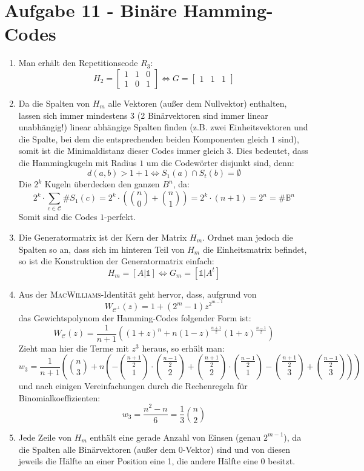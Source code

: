 \section*{Aufgabe 11 - Binäre Hamming-Codes}
\begin{enumerate}
\item
	Man erhält den Repetitionscode $R_{3}$:
	\[ H_{2} = \begin{bmatrix}1&1&0\\1&0&1\end{bmatrix} \Leftrightarrow G =
	\begin{bmatrix}1&1&1\end{bmatrix} \]
\item
	Da die Spalten von $H_{m}$ alle Vektoren (außer dem Nullvektor)
	enthalten, lassen sich immer mindestens 3 (2 Binärvektoren sind immer
	linear unabhängig!) linear abhängige Spalten finden (z.B. zwei
	Einheitsvektoren und die Spalte, bei dem die entsprechenden beiden
	Komponenten gleich $1$ sind), somit ist die Minimaldistanz dieser Codes
	immer gleich $3$. Dies bedeutet, dass die Hammingkugeln mit Radius $1$
	um die Codewörter disjunkt sind, denn:
	\[ d(a, b) > 1 + 1 \Leftrightarrow S_{1}(a) \cap S_{t}(b) = \emptyset \]
	Die $2^{k}$ Kugeln überdecken den ganzen $B^{n}$, da:
	\[ 2^{k} \cdot \sum_{c\in\mathcal{C}} \#S_{1}(c) = 2^{k} \cdot
	\left(\binom{n}{0}+\binom{n}{1}\right) = 2^{k} \cdot (n+1) = 2^{n} =
	\#\mathds{B}^{n} \]
	Somit sind die Codes $1$-perfekt.
\item
	Die Generatormatrix ist der Kern der Matrix $H_{m}$. Ordnet man jedoch
	die Spalten so an, dass sich im hinteren Teil von $H_{m}$ die
	Einheitsmatrix befindet, so ist die Konstruktion der Generatormatrix
	einfach:	
	\[ H_{m} = \left[ A | \mathds{1} \right] \Leftrightarrow G_{m} = \left[
	\mathds{1} | A^{t}\right] \]
\item	
	Aus der \textsc{MacWilliams}-Identität geht hervor, dass, aufgrund von
	\[ W_{\mathcal{C}^{\bot}}(z) = 1 + (2^{m} - 1)z^{2^{m-1}} \]
	das Gewichtspolynom der Hamming-Codes folgender Form ist:
	\[ W_{\mathcal{C}}(z) = \frac{1}{n+1}((1+z)^{n} +
	n(1-z)^{\frac{n+1}{2}}(1+z)^{\frac{n-1}{2}}) \]
	Zieht man hier die Terme mit $z^{3}$ heraus, so erhält man:
	\[ w_{3} = \frac{1}{n+1}\left(\binom{n}{3} +
		n\left(
	-\binom{\frac{n+1}{2}}{1} \cdot \binom{\frac{n-1}{2}}{2} +
 	 \binom{\frac{n+1}{2}}{2} \cdot \binom{\frac{n-1}{2}}{1} -
	 \binom{\frac{n+1}{2}}{3} + \binom{\frac{n-1}{2}}{3}\right)
		\right) \]
	und nach einigen Vereinfachungen durch die Rechenregeln für
	Binomialkoeffizienten:
	\[ w_{3} = \frac{n^{2} - n}{6} = \frac{1}{3} \binom{n}{2} \] 
\item
	Jede Zeile von $H_{m}$ enthält eine gerade Anzahl von Einsen (genau
	$2^{m-1}$), da die Spalten alle Binärvektoren (außer dem $0$-Vektor)
	sind und von diesen jeweils die Hälfte an einer Position eine 1, die
	andere Hälfte eine 0 besitzt.
	

\end{enumerate}
